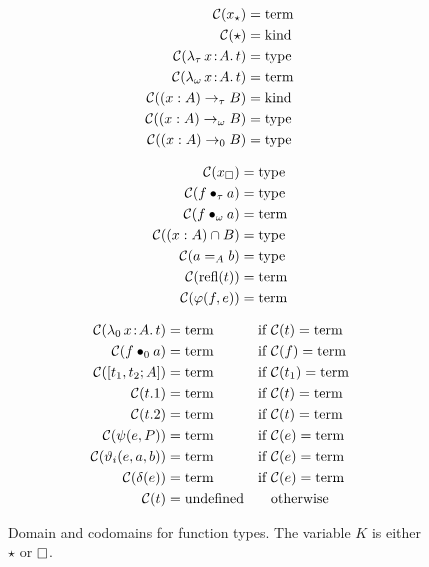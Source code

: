 
\begin{figure}
    \centering
    \begin{minipage}{0.5\textwidth}
        \begin{align*}
            \mathcal{C}(x_\star) &= \mbox{\normalfont term} \\
            \mathcal{C}(\star) &= \mbox{\normalfont kind} \\
            \mathcal{C}({\lambda_\tau}\, x\! : \! A.\, t) &= \mbox{\normalfont type} \\
            \mathcal{C}({\lambda_\omega}\, x\! : \! A.\, t) &= \mbox{\normalfont term} \\
            \mathcal{C}((x : A) \to_\tau B) &= \mbox{\normalfont kind} \\
            \mathcal{C}((x : A) \to_\omega B) &= \mbox{\normalfont type} \\
            \mathcal{C}((x : A) \to_0 B) &= \mbox{\normalfont type}
        \end{align*}
    \end{minipage}%
    \begin{minipage}{0.5\textwidth}
        \begin{align*}
            \mathcal{C}(x_\square) &= \mbox{\normalfont type} \\
            \mathcal{C}(f \bullet_{\tau} a) &= \mbox{\normalfont type} \\
            \mathcal{C}(f \bullet_{\omega} a) &= \mbox{\normalfont term} \\
            \mathcal{C}((x : A) \cap B) &= \mbox{\normalfont type} \\
            \mathcal{C}(a =_A b) &= \mbox{\normalfont type} \\
            \mathcal{C}(\text{refl}(t)) &= \mbox{\normalfont term} \\
            \mathcal{C}(\varphi(f, e)) &= \mbox{\normalfont term}
        \end{align*}
    \end{minipage}
    \begin{align*}
        \mathcal{C}({\lambda_0}\, x\! : \! A.\, t) &= \mbox{\normalfont term} &\text{if }& \mathcal{C}(t) = \mbox{\normalfont term}\\
        \mathcal{C}(f \bullet_{0} a) &= \mbox{\normalfont term} &\text{if }& \mathcal{C}(f) = \mbox{\normalfont term}\\
        \mathcal{C}([t_1, t_2; A]) &= \mbox{\normalfont term} &\text{if }& \mathcal{C}(t_1) = \mbox{\normalfont term}\\
        \mathcal{C}(t.1) &= \mbox{\normalfont term} &\text{if }& \mathcal{C}(t) = \mbox{\normalfont term}\\
        \mathcal{C}(t.2) &= \mbox{\normalfont term} &\text{if }& \mathcal{C}(t) = \mbox{\normalfont term}\\
        \mathcal{C}(\psi(e, P)) &= \mbox{\normalfont term} &\text{if }& \mathcal{C}(e) =\mbox{\normalfont term}\\
        \mathcal{C}(\vartheta_i(e, a, b)) &= \mbox{\normalfont term} &\text{if }& \mathcal{C}(e) = \mbox{\normalfont term}\\
        \mathcal{C}(\delta(e)) &= \mbox{\normalfont term} &\text{if }& \mathcal{C}(e) = \mbox{\normalfont term} \\
        \mathcal{C}(t) &= \text{undefined} &&\text{otherwise}
    \end{align*}
    \caption{Domain and codomains for function types. The variable $K$ is either $\star$ or $\kind$.}
\end{figure}
